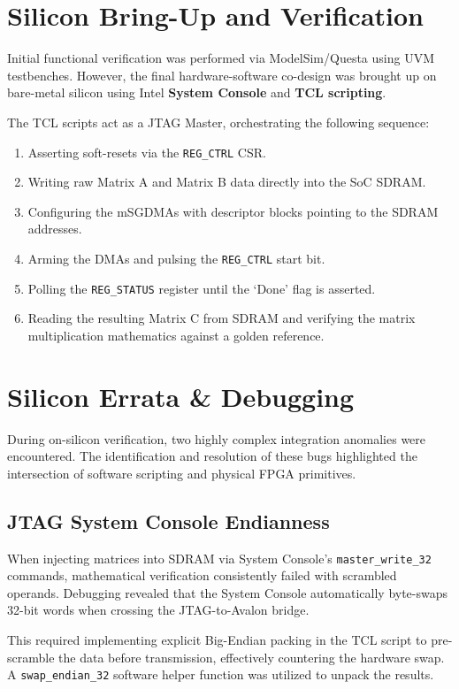 \documentclass[12pt, letterpaper]{article}
\begin{document}
\section{Silicon Bring-Up and Verification}
Initial functional verification was performed via ModelSim/Questa using UVM testbenches. However, the final hardware-software co-design was brought up on bare-metal silicon using Intel \textbf{System Console} and \textbf{TCL scripting}.

The TCL scripts act as a JTAG Master, orchestrating the following sequence:
\begin{enumerate}
    \item Asserting soft-resets via the \texttt{REG\_CTRL} CSR.
    \item Writing raw Matrix A and Matrix B data directly into the SoC SDRAM.
    \item Configuring the mSGDMAs with descriptor blocks pointing to the SDRAM addresses.
    \item Arming the DMAs and pulsing the \texttt{REG\_CTRL} start bit.
    \item Polling the \texttt{REG\_STATUS} register until the `Done' flag is asserted.
    \item Reading the resulting Matrix C from SDRAM and verifying the matrix multiplication mathematics against a golden reference.
\end{enumerate}

\section{Silicon Errata \& Debugging}
During on-silicon verification, two highly complex integration anomalies were encountered. The identification and resolution of these bugs highlighted the intersection of software scripting and physical FPGA primitives.

\subsection{JTAG System Console Endianness}
When injecting matrices into SDRAM via System Console's \texttt{master\_write\_32} commands, mathematical verification consistently failed with scrambled operands. Debugging revealed that the System Console automatically byte-swaps 32-bit words when crossing the JTAG-to-Avalon bridge. 

This required implementing explicit Big-Endian packing in the TCL script to pre-scramble the data before transmission, effectively countering the hardware swap. A \texttt{swap\_endian\_32} software helper function was utilized to unpack the results.
\end{document}

